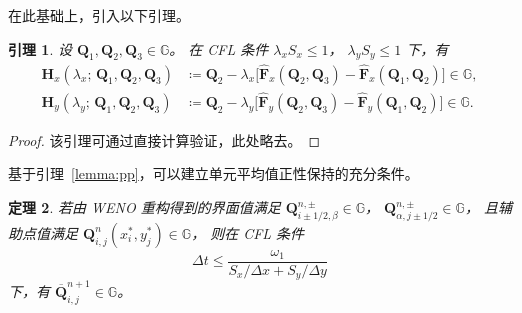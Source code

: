 \documentclass[12pt,a4paper]{article}
\newtheorem{theorem}{定理}[section]
\newtheorem{lemma}[theorem]{引理}
\numberwithin{equation}{section}    %
\begin{document}
在此基础上，引入以下引理。

\begin{lemma}
    \label{lemma:pp}
    设 $\bm{Q}_1, \bm{Q}_2, \bm{Q}_3 \in \mathbb{G}$。
    在 CFL 条件 $\lambda_x S_x \leqslant 1$，
    $\lambda_y S_y \leqslant 1$ 下，有
    \begin{equation}
        \begin{aligned}
            \bm{H}_x(\lambda_x;\, \bm{Q}_1, \bm{Q}_2, \bm{Q}_3)
            &\coloneqq \bm{Q}_2
            - \lambda_x\bigl[
            \hat{\bm{F}}_x(\bm{Q}_2, \bm{Q}_3)
            - \hat{\bm{F}}_x(\bm{Q}_1, \bm{Q}_2)
            \bigr] \in \mathbb{G}, \\
            \bm{H}_y(\lambda_y;\, \bm{Q}_1, \bm{Q}_2, \bm{Q}_3)
            &\coloneqq \bm{Q}_2
            - \lambda_y\bigl[
            \hat{\bm{F}}_y(\bm{Q}_2, \bm{Q}_3)
            - \hat{\bm{F}}_y(\bm{Q}_1, \bm{Q}_2)
            \bigr] \in \mathbb{G}.
        \end{aligned}
    \end{equation}
\end{lemma}
\begin{proof}
    该引理可通过直接计算验证，此处略去。
\end{proof}

基于引理~\autoref{lemma:pp}，可以建立单元平均值正性保持的充分条件。

\begin{theorem}
    \label{thm:cell_avg_pp}
    若由 WENO 重构得到的界面值满足
    $\bm{Q}_{i\pm 1/2, \beta}^{n,\pm} \in \mathbb{G}$，
    $\bm{Q}_{\alpha, j\pm 1/2}^{n,\pm} \in \mathbb{G}$，
    且辅助点值满足 $\bm{Q}_{i,j}^n(x_i^*, y_j^*) \in \mathbb{G}$，
    则在 CFL 条件
    \begin{equation}
        \label{eq:cfl_pp}
        \Delta t \leqslant
        \frac{\omega_1}{S_x/\Delta x + S_y/\Delta y}
    \end{equation}
    下，有 $\overline{\bm{Q}}_{i,j}^{n+1} \in \mathbb{G}$。
\end{theorem}
\end{document}
